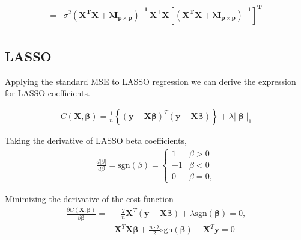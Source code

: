 \documentclass[a4paper,12pt]{article}
\begin{document}
\begin{equation}
\begin{split}
=& \sigma^2\boldsymbol{(\mathbf{X}^{T} \mathbf{X} + \lambda \mathbf{I}_{p \times p})^{-1} } \, \mathbf{X}^{\top}\mathbf{X}[\boldsymbol{(\mathbf{X}^{T} \mathbf{X} + \lambda \mathbf{I}_{p \times p})^{-1}}]^{\boldsymbol{T}} \\
\end{split}
\end{equation}


















\subsection{LASSO}
Applying the standard MSE to LASSO regression we can derive the expression for LASSO coefficients.

\begin{equation} \label{eq1}
\begin{split}
C(\boldsymbol{X},\boldsymbol{\beta})=\frac{1}{n}\left\{(\boldsymbol{y}-\boldsymbol{X}\boldsymbol{\beta})^T(\boldsymbol{y}-\boldsymbol{X}\boldsymbol{\beta})\right\}+\lambda\vert\vert\boldsymbol{\beta}\vert\vert_1
\end{split}
\end{equation}

\noindent
Taking the derivative of  LASSO beta coefficients,
\begin{equation} \label{eq1}
\begin{split}
\frac{d \vert \beta\vert}{d \beta}=\mathrm{sgn}(\beta)=\left\{\begin{array}{ccc} 1 & \beta > 0 \\-1 & \beta < 0 \\0 & \beta = 0, \end{array}\right.
\end{split}
\end{equation}

\noindent
Minimizing the derivative of the cost function
\begin{equation} \label{eq1}
\begin{split}
\frac{\partial C(\boldsymbol{X},\boldsymbol{\beta})}{\partial \boldsymbol{\beta}}=&-\frac{2}{n}\boldsymbol{X}^T(\boldsymbol{y}-\boldsymbol{X}\boldsymbol{\beta})+\lambda \mathrm{sgn}(\boldsymbol{\beta})=0,\\
&\boldsymbol{X}^T\boldsymbol{X}\boldsymbol{\beta}+\frac{n\cdot\lambda}{2} \mathrm{sgn}(\boldsymbol{\beta})-\boldsymbol{X}^T\boldsymbol{y}=0
\end{split}
\end{equation}
\end{document}
